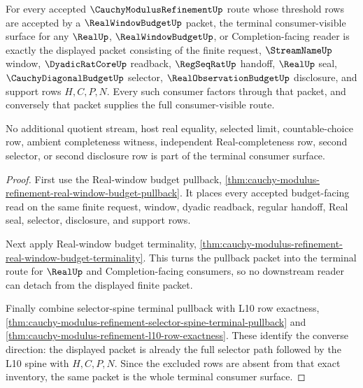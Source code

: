 \begin{theorem}
\label{thm:cauchy-modulus-refinement-real-window-terminal-consumer}
For every accepted $\CauchyModulusRefinementUp$ route whose threshold rows
are accepted by a $\RealWindowBudgetUp$ packet, the terminal
consumer-visible surface for any $\RealUp$, $\RealWindowBudgetUp$, or
Completion-facing reader is exactly the displayed packet consisting of the
finite request, $\StreamNameUp$ window, $\DyadicRatCoreUp$ readback,
$\RegSeqRatUp$ handoff, $\RealUp$ seal, $\CauchyDiagonalBudgetUp$ selector,
$\RealObservationBudgetUp$ disclosure, and support rows $H,C,P,N$.
Every such consumer factors through that packet, and conversely that packet
supplies the full consumer-visible route.

No additional quotient stream, host real equality, selected limit,
countable-choice row, ambient completeness witness, independent
Real-completeness row, second selector, or second disclosure row is part of
the terminal consumer surface.
\end{theorem}
\begin{proof}
First use the Real-window budget pullback,
\autoref{thm:cauchy-modulus-refinement-real-window-budget-pullback}. It
places every accepted budget-facing read on the same finite request, window,
dyadic readback, regular handoff, Real seal, selector, disclosure, and
support rows.

Next apply Real-window budget terminality,
\autoref{thm:cauchy-modulus-refinement-real-window-budget-terminality}. This
turns the pullback packet into the terminal route for $\RealUp$ and
Completion-facing consumers, so no downstream reader can detach from the
displayed finite packet.

Finally combine selector-spine terminal pullback with L10 row exactness,
\autoref{thm:cauchy-modulus-refinement-selector-spine-terminal-pullback} and
\autoref{thm:cauchy-modulus-refinement-l10-row-exactness}. These identify the
converse direction: the displayed packet is already the full selector path
followed by the L10 spine with $H,C,P,N$. Since the excluded rows are absent
from that exact inventory, the same packet is the whole terminal consumer
surface.
\end{proof}
